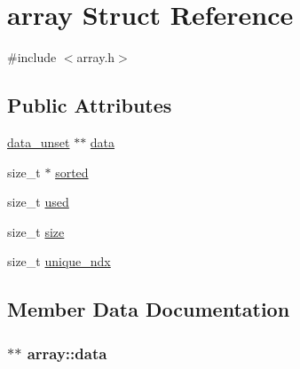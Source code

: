 \hypertarget{structarray}{\section{array Struct Reference}
\label{structarray}
}


{\ttfamily \#include $<$array.\-h$>$}

\subsection*{Public Attributes}
\begin{DoxyCompactItemize}
\item 
\hyperlink{structdata__unset}{data\-\_\-unset} $\ast$$\ast$ \hyperlink{structarray_a5836436f13fe0c470088f135d278b391}{data}
\item 
size\-\_\-t $\ast$ \hyperlink{structarray_a808e210b6e5be6f238cf06727f4ef757}{sorted}
\item 
size\-\_\-t \hyperlink{structarray_a83a03fea6f802526509b398c24013d5b}{used}
\item 
size\-\_\-t \hyperlink{structarray_a223f5760985fe124132e794b6e3e1a64}{size}
\item 
size\-\_\-t \hyperlink{structarray_af86dee9c05aa7a91196b9d8a0a42d1fd}{unique\-\_\-ndx}
\end{DoxyCompactItemize}


\subsection{Member Data Documentation}
\hypertarget{structarray_a5836436f13fe0c470088f135d278b391}{
\subsubsection[{data}]{$\ast$$\ast$ array\-::data}}\label{structarray_a5836436f13fe0c470088f135d278b391}


